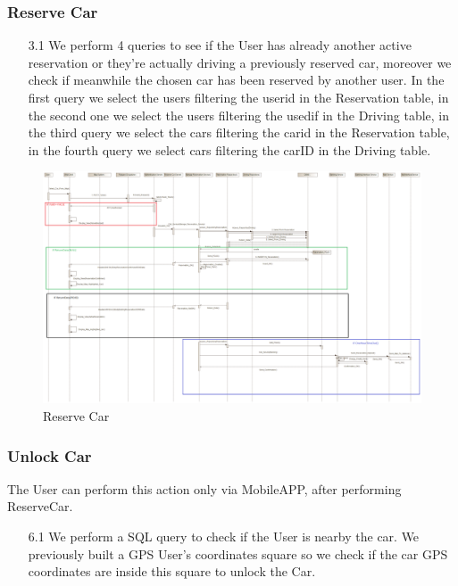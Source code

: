 \documentclass[12pt]{article}
\begin{document}
\subsubsection{Reserve Car}
\begin{enumerate}
	\item[3.1] We perform 4 queries to see if the User has already another active reservation or they're actually driving a previously reserved car, moreover we check if meanwhile the chosen car has been reserved by another user. In the first query we select the users filtering the userid in the Reservation table, in the second one we select the users filtering the usedif in the Driving table, in the third query we select the cars filtering the carid in the Reservation table, in the fourth query we select cars filtering the carID in the Driving table.
\end{enumerate}

\begin{figure}[h]
	\centering
	\includegraphics[width=\textwidth]{../Images/Sequence_Final/Reserve_Car}
	\caption{Reserve Car}
\end{figure}
\clearpage
\subsubsection{Unlock Car}
The User can perform this action only via MobileAPP, after performing ReserveCar.
\begin{enumerate}
	\item[6.1] We perform a SQL query to check if the User is nearby the car. We previously built a GPS User’s coordinates square so we check if the car GPS coordinates are inside this square to unlock the Car.
\end{enumerate}
\end{document}
